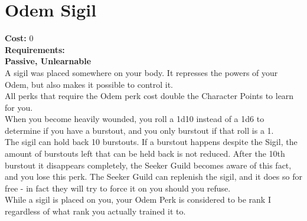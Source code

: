 \section{Odem Sigil}\label{perk:odemSigil}
\textbf{Cost:} 0\\
\textbf{Requirements:}\\
\textbf{Passive, Unlearnable}\\
A sigil was placed somewhere on your body.
It represses the powers of your Odem, but also makes it possible to control it.\\
All perks that require the Odem perk cost double the Character Points to learn for you.\\
When you become heavily wounded, you roll a 1d10 instead of a 1d6 to determine if you have a burstout, and you only burstout if that roll is a 1.\\
The sigil can hold back 10 burstouts.
If a burstout happens despite the Sigil, the amount of burstouts left that can be held back is not reduced.
After the 10th burstout it disappears completely, the Seeker Guild becomes aware of this fact, and you lose this perk.
The Seeker Guild can replenish the sigil, and it does so for free - in fact they will try to force it on you should you refuse.\\
While a sigil is placed on you, your Odem Perk is considered to be rank I regardless of what rank you actually trained it to.\\